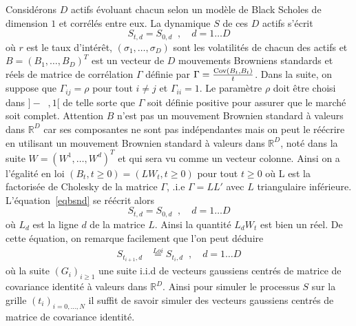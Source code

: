 \documentclass[a4paper,11pt]{article}
\def\R{{\mathbb R}}
\def\Cov{\mathop{\rm Cov}\nolimits}
\def\inv#1{\mathop{\frac{1}{ #1}}\nolimits}
\def\expp#1{\mathop {\mathrm{e}^{ #1}}}
\begin{document}
Considérons $D$ actifs évoluant chacun selon un modèle de Black Scholes de
dimension $1$ et corrélés entre eux. La dynamique $S$ de ces $D$ actifs s'écrit
\begin{equation}
  \label{eqbsnd}
  S_{t,d} = S_{0,d} \expp{(r- {(\sigma_d)}^2/2) t + \sigma_d B_{t,d}}, \quad d=1\dots D
\end{equation}
où  $r$ est le taux d'intérêt, $(\sigma_1, \dots, \sigma_D)$ sont les
volatilités de chacun des actifs et $B = (B_1, \dots, B_D)^T$ est un vecteur de
$D$ mouvements Browniens standards et réels de matrice de corrélation $\Gamma$
définie par $\Gamma = \frac{\Cov(B_t, B_t)}{t}$. Dans la suite, on suppose que
$\Gamma_{ij} = \rho$ pour tout $i \neq j$ et $\Gamma_{ii} = 1$. Le paramètre
$\rho$ doit être choisi dans $]-\inv{D-1}, 1[$ de telle sorte que $\Gamma$ soit
définie positive pour assurer que le marché soit complet.  Attention $B$ n'est
pas un mouvement Brownien standard à valeurs dans $\R^D$ car ses composantes ne
sont pas indépendantes mais on peut le réécrire en utilisant un mouvement
Brownien standard à valeurs dans $\R^D$, noté dans la suite $W = (W^1, \dots,
W^d)^T$ et qui sera vu comme un vecteur colonne. Ainsi on a l'égalité en loi
$(B_t, t \ge 0) = (L W_t, t \ge 0)$ pour tout $t \ge 0$ où L est la factorisée
de Cholesky de la matrice $\Gamma$, .i.e $\Gamma = LL'$ avec $L$ triangulaire
inférieure.  L'équation~\eqref{eqbsnd} se réécrit alors
\begin{equation*}
  S_{t,d} = S_{0,d} \expp{(r- {(\sigma_d)}^2/2) t + \sigma_d L_d W_t}, \quad d=1\dots D
\end{equation*}
où $L_d$ est la ligne $d$ de la matrice $L$. Ainsi la quantité $L_d W_t$ est
bien un réel.
De cette équation, on remarque facilement que l'on peut déduire
\begin{align*}
  S_{t_{i+1},d} & \stackrel{Loi}{=} S_{t_i,d} \expp{(r- {(\sigma_d)}^2/2)
  (t_{i+1} - t_i) + \sigma_d \sqrt{(t_{i+1} - t_i)}L_d G_{i+1}}, \quad d=1\dots D
\end{align*}
où la suite $(G_i)_{i \ge 1}$ une suite i.i.d de vecteurs gaussiens centrés de
matrice de covariance identité à valeurs dans $\R^D$. Ainsi pour simuler le
processus $S$ sur la grille $(t_i)_{i=0,\dots,N}$ il suffit de savoir simuler
des vecteurs gaussiens centrés de matrice de covariance identité. \\
\end{document}
